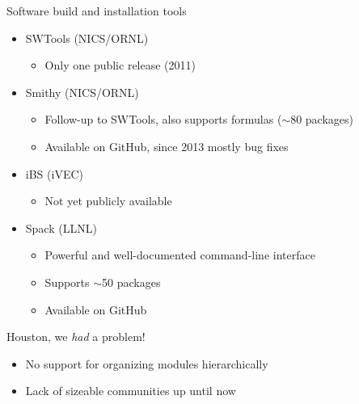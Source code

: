 \documentclass[10pt,xcolor={usenames,dvipsnames}]{beamer}
\begin{document}
\begin{frame}{Software build and installation tools}
\begin{itemize}
    \item
        SWTools (NICS/ORNL)
        \begin{itemize}
            \item
                Only one public release (2011)
        \end{itemize}
    \item
        Smithy (NICS/ORNL)
        \begin{itemize}
            \item
                Follow-up to SWTools, also supports formulas ($\sim$80 packages)
            \item
                Available on GitHub, since 2013 mostly bug fixes
        \end{itemize}
    \item
        iBS (iVEC)
        \begin{itemize}
            \item
                Not yet publicly available
        \end{itemize}
    \item
        Spack (LLNL)
        \begin{itemize}
            \item
                Powerful and well-documented command-line interface
            \item
                Supports $\sim$50 packages
            \item
                Available on GitHub
        \end{itemize}
\end{itemize}

\begin{center}
    \begin{minipage}{0.9\textwidth}
        \begin{alertblock}{Houston, we \emph{had} a problem!}
            \footnotesize
            \begin{itemize}
            \item No support for organizing modules hierarchically
            \item Lack of sizeable communities up until now
            \end{itemize}
        \end{alertblock}
    \end{minipage}
\end{center}

\end{frame}
\end{document}
